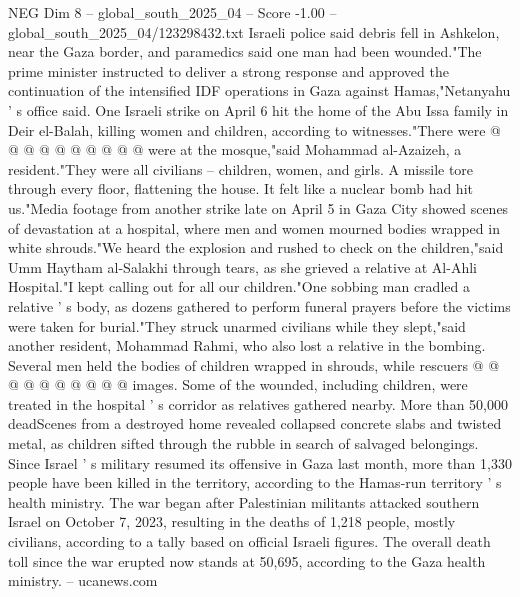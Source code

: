 \begin{textsample}{NEG Dim 8 – global\_south\_2025\_04 – Score -1.00 – global\_south\_2025\_04/123298432.txt}
Israeli police said debris fell in Ashkelon, near the Gaza border, and paramedics said one man had been wounded."The prime minister instructed to deliver a strong response and approved the continuation of the intensified IDF operations in Gaza against Hamas,"Netanyahu ' s office said.
One Israeli strike on April 6 hit the home of the Abu Issa family in Deir el-Balah, killing women and children, according to witnesses."There were @ @ @ @ @ @ @ @ @ @ were at the mosque,"said Mohammad al-Azaizeh, a resident."They were all civilians -- children, women, and girls.
A missile tore through every floor, flattening the house.
It felt like a nuclear bomb had hit us."Media footage from another strike late on April 5 in Gaza City showed scenes of devastation at a hospital, where men and women mourned bodies wrapped in white shrouds."We heard the explosion and rushed to check on the children,"said Umm Haytham al-Salakhi through tears, as she grieved a relative at Al-Ahli Hospital."I kept calling out for all our children."One sobbing man cradled a relative ' s body, as dozens gathered to perform funeral prayers before the victims were taken for burial."They struck unarmed civilians while they slept,"said another resident, Mohammad Rahmi, who also lost a relative in the bombing.
Several men held the bodies of children wrapped in shrouds, while rescuers @ @ @ @ @ @ @ @ @ @ images.
Some of the wounded, including children, were treated in the hospital ' s corridor as relatives gathered nearby.
More than 50,000 deadScenes from a destroyed home revealed collapsed concrete slabs and twisted metal, as children sifted through the rubble in search of salvaged belongings.
Since Israel ' s military resumed its offensive in Gaza last month, more than 1,330 people have been killed in the territory, according to the Hamas-run territory ' s health ministry.
The war began after Palestinian militants attacked southern Israel on October 7, 2023, resulting in the deaths of 1,218 people, mostly civilians, according to a tally based on official Israeli figures.
The overall death toll since the war erupted now stands at 50,695, according to the Gaza health ministry. -- ucanews.com

\end{textsample}
